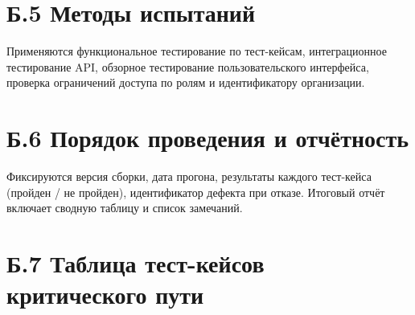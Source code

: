 \section*{Б.5 Методы испытаний}

Применяются функциональное тестирование по тест-кейсам, интеграционное тестирование API, обзорное тестирование пользовательского интерфейса, проверка ограничений доступа по ролям и идентификатору организации\cite{iso29119,kaner_testing_en,gost1930179}.

\section*{Б.6 Порядок проведения и отчётность}

Фиксируются версия сборки, дата прогона, результаты каждого тест-кейса (пройден / не пройден), идентификатор дефекта при отказе. Итоговый отчёт включает сводную таблицу и список замечаний.

\section*{Б.7 Таблица тест-кейсов критического пути}


